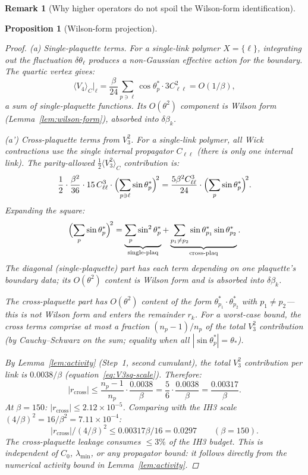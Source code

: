 \documentclass[11pt]{article}
\newtheorem{proposition}[theorem]{Proposition}
\theoremstyle{definition}
\newtheorem{remark}[theorem]{Remark}
\begin{document}
\begin{remark}[Why higher operators do not spoil the Wilson-form identification]
\begin{proposition}[Wilson-form projection]
\begin{enumerate}[nosep,label=(\roman*)]
\begin{proof}
\emph{(a) Single-plaquette terms.}
For a single-link polymer $X=\{\ell\}$, integrating out
the fluctuation $\delta\theta_\ell$ produces a non-Gaussian
effective action for the boundary.  The quartic vertex gives:
\begin{equation}
\langle V_4\rangle_C\big|_\ell
=\frac{\beta}{24}\sum_{p\ni\ell}\cos\theta_p^*\cdot
3C_{\ell\ell}^2=O(1/\beta),
\end{equation}
a sum of single-plaquette functions.
Its $O(\theta^2)$ component is
Wilson form (Lemma~\ref{lem:wilson-form}), absorbed into
$\delta\beta_k$.

\emph{(a') Cross-plaquette terms from $V_3^2$.}
For a single-link polymer, all Wick contractions use
the \emph{single} internal propagator $C_{\ell\ell}$
(there is only one internal link).  The parity-allowed
$\frac{1}{2}\langle V_3^2\rangle_C$ contribution is:
\begin{equation}\label{eq:V3sq}
\frac{1}{2}\cdot\frac{\beta^2}{36}\cdot
15\,C_{\ell\ell}^3\cdot
\Bigl(\sum_{p\ni\ell}\sin\theta_p^*\Bigr)^{\!2}
=\frac{5\beta^2C_{\ell\ell}^3}{24}\cdot
\Bigl(\sum_p\sin\theta_p^*\Bigr)^{\!2}.
\end{equation}
Expanding the square:
\begin{equation}
\Bigl(\sum_p\sin\theta_p^*\Bigr)^{\!2}
=\underbrace{\sum_p\sin^2\theta_p^*}
_{\text{single-plaq}}
+\underbrace{\sum_{p_1\ne p_2}
\sin\theta_{p_1}^*\sin\theta_{p_2}^*}
_{\text{cross-plaq}}.
\end{equation}
The diagonal (single-plaquette) part has each term depending on
one plaquette's boundary data; its $O(\theta^2)$ content is
Wilson form and is absorbed into $\delta\beta_k$.

The cross-plaquette part has $O(\theta^2)$ content of the form
$\theta_{p_1}^*\cdot\theta_{p_2}^*$ with $p_1\ne p_2$---this
is \emph{not} Wilson form and enters the remainder $r_k$.
For a worst-case bound, the cross terms comprise at most a
fraction $(n_p{-}1)/n_p$ of the total $V_3^2$ contribution
(by Cauchy--Schwarz on the sum; equality when all
$|\sin\theta_p^*|=\theta_*$).

By Lemma~\ref{lem:activity} (Step~1, second cumulant),
the \emph{total} $V_3^2$ contribution per link is
$0.0038/\beta$ (equation~\eqref{eq:V3sq-scale}).
Therefore:
\begin{equation}
|r_{\mathrm{cross}}|
\le\frac{n_p{-}1}{n_p}\cdot\frac{0.0038}{\beta}
=\frac{5}{6}\cdot\frac{0.0038}{\beta}
=\frac{0.00317}{\beta}.
\end{equation}
At $\beta=150$: $|r_{\mathrm{cross}}|\le 2.12\times 10^{-5}$.
Comparing with the IH3 scale
$(4/\beta)^2=16/\beta^2=7.11\times 10^{-4}$:
\begin{equation}
|r_{\mathrm{cross}}|/(4/\beta)^2
\le 0.00317\beta/16=0.0297
\qquad(\beta=150).
\end{equation}
The cross-plaquette leakage consumes
$\le 3\%$ of the IH3 budget.  This is independent of
$C_0$, $\lambda_{\min}$, or any propagator bound:
it follows directly from the numerical activity bound
in Lemma~\ref{lem:activity}.


\end{proof}
\end{enumerate}
\end{proposition}
\end{remark}
\end{document}
